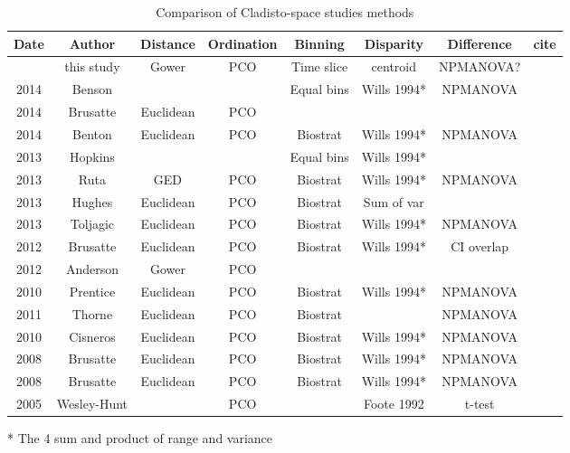 \documentclass[12pt,letterpaper]{article}
\begin{document}
\begin{table}[ht]
\caption{Comparison of Cladisto-space studies methods}
\centering
\begin{tabular}{cccccccc}
  \hline
    Date & Author      & Distance  & Ordination & Binning    & Disparity   & Difference & cite \\ %
  \hline
         & this study  & Gower     & PCO        & Time slice & centroid    & NPMANOVA?  & \\
    2014 & Benson      &           &            & Equal bins & Wills 1994* & NPMANOVA   & \cite{bensonfaunal2014} \\
    2014 & Brusatte    & Euclidean & PCO        &            &             &            & \cite{brusattegradual2014} \\
    2014 & Benton      & Euclidean & PCO        & Biostrat   & Wills 1994* & NPMANOVA   & \cite{bentonmodels2014} \\
    2013 & Hopkins     &           &            & Equal bins & Wills 1994* &            & \cite{hopkinsdecoupling2013} \\             
    2013 & Ruta        & GED       & PCO        & Biostrat   & Wills 1994* & NPMANOVA   & \cite{ruta2013} \\
    2013 & Hughes      & Euclidean & PCO        & Biostrat   & Sum of var  &            & \cite{Hughes20082013} \\
    2013 & Toljagic    & Euclidean & PCO        & Biostrat   & Wills 1994* & NPMANOVA   & \cite{toljagictriassic-jurassic2013} \\
    2012 & Brusatte    & Euclidean & PCO        & Biostrat   & Wills 1994* & CI overlap & \cite{brusattedinosaur2012} \\
    2012 & Anderson    & Gower     & PCO        &            &             &            & \cite{anderson2012using} \\
    2010 & Prentice    & Euclidean & PCO        & Biostrat   & Wills 1994* & NPMANOVA   & \cite{prentice2011} \\
    2011 & Thorne      & Euclidean & PCO        & Biostrat   &             & NPMANOVA   & \cite{thorneresetting2011} \\
    2010 & Cisneros    & Euclidean & PCO        & Biostrat   & Wills 1994* & NPMANOVA   & \cite{cisneros2010} \\
    2008 & Brusatte    & Euclidean & PCO        & Biostrat   & Wills 1994* & NPMANOVA   & \cite{brusatte50} \\
    2008 & Brusatte    & Euclidean & PCO        & Biostrat   & Wills 1994* & NPMANOVA   & \cite{Brusatte12092008} \\
    2005 & Wesley-Hunt &           & PCO        &            & Foote 1992  & t-test     & \cite{Wesley-Hunt2005} \\
  \hline
\end{tabular}
\end{table}
* The 4 sum and product of range and variance
\end{document}
